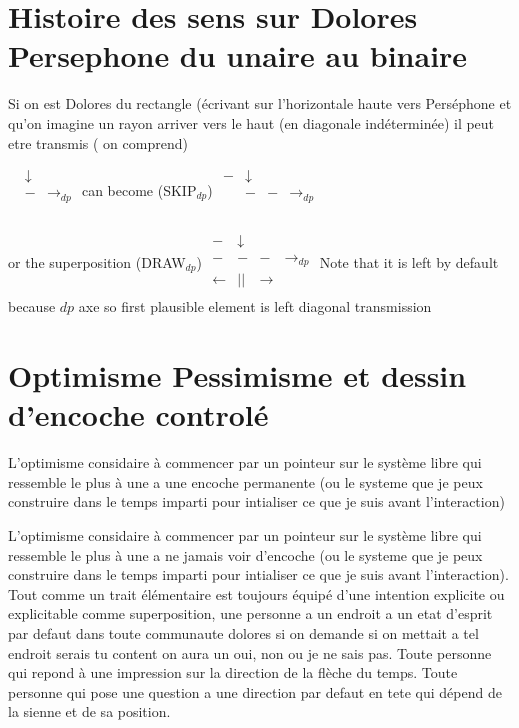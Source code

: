 \documentclass{article}
\begin{document}
 
 \section{Histoire des sens sur Dolores Persephone du unaire au binaire}
 Si on est Dolores du rectangle  (écrivant sur l'horizontale haute vers Perséphone et qu'on imagine un rayon arriver vers le haut  (en diagonale indéterminée)  il peut etre transmis ( on comprend)
 
 $\begin{matrix}
 &\downarrow\\
 &-&\rightarrow_{dp}\\
 \\
 \end{matrix} $   can become (SKIP$_{dp}$)   
 $\begin{matrix}
 -&\downarrow\\
 &-&-&\rightarrow_{dp}\\
 \\
 \end{matrix} $ 
 
or the superposition  (DRAW$_{dp}$)    
$\begin{matrix}
 -&\downarrow\\
 -&-&-&\rightarrow_{dp}\\
 \leftarrow&||&\rightarrow\\
 \end{matrix} $  
 Note that it is left by default because $dp$ axe so first plausible element is left diagonal transmission 

 
 \section{Optimisme Pessimisme et dessin d'encoche controlé}
L'optimisme considaire à commencer par un pointeur sur le système libre qui ressemble le plus à une a une encoche permanente  (ou le systeme que je peux construire dans le temps imparti pour intialiser ce que je suis avant l'interaction)

L'optimisme considaire à commencer par un pointeur sur le système libre qui ressemble le plus à une a ne jamais voir d'encoche  (ou le systeme que je peux construire dans le temps imparti pour intialiser ce que je suis avant l'interaction).
Tout comme un trait élémentaire est toujours équipé d'une intention explicite ou explicitable comme superposition, une personne a un endroit a un etat d'esprit par defaut
dans toute communaute  dolores si on demande si on mettait a tel endroit serais tu content on aura un oui, non ou je ne sais pas.
Toute personne qui repond à une impression sur la direction de la flèche du temps.
Toute personne qui pose une question a une direction par defaut en tete qui dépend de la sienne et de sa position. 
   
\end{document}
